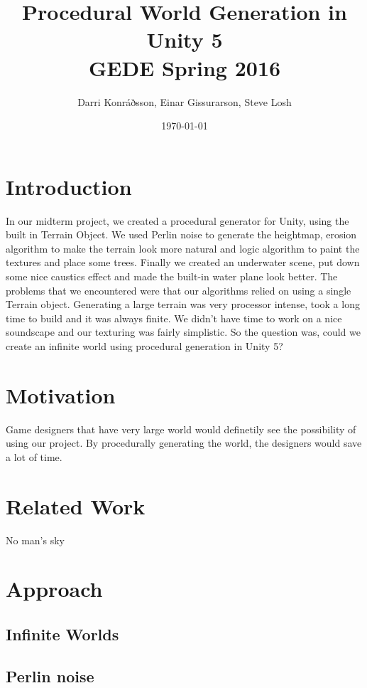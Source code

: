 \documentclass{article}
\title{%
    Procedural World Generation in Unity 5
\\ \large GEDE Spring 2016}
\author{Darri Konráðsson, Einar Gissurarson, Steve Losh}
\date{\today}
\begin{document}
\maketitle

\section{Introduction}
\label{sec:intro}
In our midterm project, we created a procedural generator for Unity, using the built in Terrain Object. We used Perlin noise to generate the heightmap, erosion algorithm to make the terrain look more natural and logic algorithm to paint the textures and place some trees.
Finally we created an underwater scene, put down some nice caustics effect and made the built-in water plane look better. 
The problems that we encountered were that our algorithms relied on using a single Terrain object.
Generating a large terrain was very processor intense, took a long time to build and it was always finite.
We didn't have time to work on a nice soundscape and our texturing was fairly simplistic.
So the question was, could we create an infinite world using procedural generation in Unity 5?

\section{Motivation}
\label{sec:motiv}
Game designers that have very large world would definetily see the possibility of using our project. By procedurally generating the world, the designers would save a lot of time.

\section{Related Work}
\label{sec:related}
No man's sky

\section{Approach}
\label{sec:approach}

\subsection{Infinite Worlds}
\label{subsec:infinite}

\subsection{Perlin noise}
\label{subsec:perlin}
\end{document}
